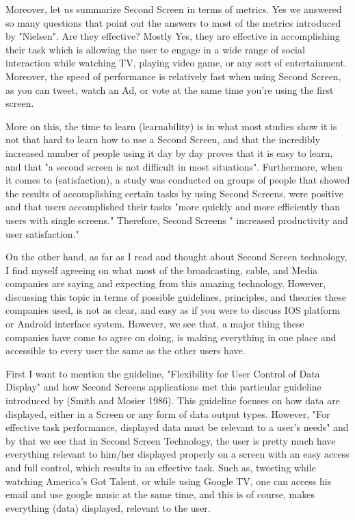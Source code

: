 \documentclass[12pt, oneside]{amsart}   	%
\begin{document}
 Moreover, let us summarize Second Screen in terms of metrics.  Yes we answered so many questions that point out the answers to most of the metrics introduced by "Nielsen".  Are they effective? Mostly Yes, they are  effective in accomplishing their task which is allowing the user to engage in a wide range of social interaction while watching TV, playing video game, or any sort of entertainment.  Moreover, the speed of performance is relatively fast when using Second Screen, as you can tweet, watch an Ad, or vote at the same time you're using the first screen.
 
 More on this, the time to learn (learnability) is in what most studies show it is not that hard to learn how to use a  Second Screen, and that the incredibly increased number of people using it day by day proves that it is easy to learn, and that "a second screen is not difficult in most situations"\cite{AdvDisv}.  Furthermore, when it comes to (satisfaction), a study was conducted on groups of people that showed the results of accomplishing certain tasks by using Second Screens, were positive and that users accomplished their tasks "more quickly and more 
efficiently than users with single screens."\cite{Dell} Therefore, Second Screens " increased productivity and user satisfaction."\cite{Dell} 
 
 On the other hand, as far as I read and thought about Second Screen technology, I find myself agreeing on what most of the broadcasting, cable, and Media companies are saying and expecting from this amazing technology.  However, discussing this topic in terms of possible guidelines, principles, and theories these companies used, is not as clear, and easy as if you were to discuss IOS platform or Android interface system.  However, we see that, a major thing these companies have come to agree on doing, is making everything in one place and accessible to every user the same as the other users have.

 First I want to mention the guideline, "Flexibility for User Control of Data Display" and how Second Screens applications met this particular guideline introduced by (Smith and Mosier 1986).  This guideline focuses on how data are displayed, either in a Screen or any form of data output types.  However, "For effective task performance, displayed data must be relevant to a user's needs"\cite{Guideline} and by that we see that in Second Screen Technology, the user is pretty much have everything relevant to him/her displayed properly on a screen with an easy access and full control, which results in an effective task.  Such as, tweeting while watching America's Got Talent, or while using Google TV, one can access his email and use google music at the same time, and this is of course, makes everything (data) displayed, relevant to the user. 
\end{document}

